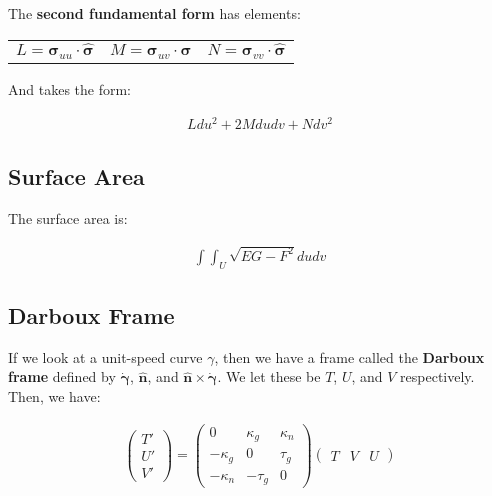 \documentclass[11pt]{article}
\begin{document}
The \textbf{second fundamental form} has elements:

\begin{center}
    \begin{tabular}{ c c c }
        $L = \boldsymbol{\sigma}_{uu} \cdot \hat{\boldsymbol{\sigma}}$ & $M = \boldsymbol{\sigma}_{uv} \cdot \hat{\boldsymbol{\sigma}}$ & $N = \boldsymbol{\sigma}_{vv} \cdot \hat{\boldsymbol{\sigma}}$
    \end{tabular}
\end{center}

And takes the form:

\begin{align*}
    Ldu^{2} + 2Mdudv + Ndv^{2}
\end{align*}

\subsection{Surface Area}
\label{sec:org7c0cbb4}
The surface area is:

\begin{align*}
    \int \int_{U} \sqrt{EG - F^{2}} dudv
\end{align*}

\subsection{Darboux Frame}
\label{sec:org92621fe}
If we look at a unit-speed curve \(\gamma\), then we have a frame called the \textbf{Darboux frame} defined by \(\dot{\boldsymbol{\gamma}}\), \(\hat{\boldsymbol{n}}\), and \(\hat{\boldsymbol{n}} \times \dot{\boldsymbol{\gamma}}\). We let these be \(T\), \(U\), and \(V\) respectively. Then, we have:

\begin{align*}
    \begin{pmatrix} T' \\ U' \\ V' \end{pmatrix} =
    \begin{pmatrix}
        0 & \kappa_{g} & \kappa_{n} \\
        -\kappa_{g} & 0 & \tau_{g} \\
        -\kappa_{n} & -\tau_{g} & 0
    \end{pmatrix}
    \begin{pmatrix} T & V & U \end{pmatrix}
\end{align*}
\end{document}
